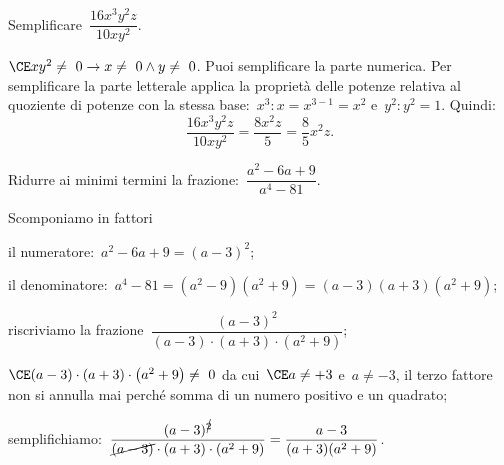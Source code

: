 \begin{exrig}
 \begin{esempio}
Semplificare~$\dfrac{16x^{3}y^{2}z}{10xy^{2}}$.

$\CE xy^{2}\neq~0 \rightarrow x\neq~0 \wedge y\neq~0$.
Puoi semplificare la parte numerica.
Per semplificare la parte letterale applica la proprietà delle potenze relativa al quoziente di potenze con la stessa
base:~$x^{3}:x=x^{3-1}=x^{2}$ e~$y^{2}:y^{2}=1$. Quindi:
\[\frac{16x^{3}y^{2}z}{10xy^{2}}=\frac{8x^{2}z}{5}=\frac{8}{5}x^{2}z.\]
 \end{esempio}

 \begin{esempio}
Ridurre ai minimi termini la frazione:~$\dfrac{a^{2}-6a+9}{a^{4}-81}$.
\begin{itemize*}
 \item Scomponiamo in fattori
  \begin{itemize*}
  \item il numeratore:~$a^2 - 6a +9 = (a - 3 )^2$;
  \item il denominatore:~$a^4 - 81 = \left(a^2 - 9\right)\left(a^2 + 9\right) = (a - 3)(a + 3)\left(a^2 + 9\right)$;
  \end{itemize*}
 \item riscriviamo la frazione~$\dfrac{\left(a-3\right)^{2}}{(a-3)\cdot(a+3)\cdot \left(a^{2}+9\right)}$;
 \item $\CE (a-3)\cdot(a+3)\cdot\left(a^{2}+9\right)\neq~0$ da cui~$\CE a \neq +3$ e~$a \neq -3$,
    il terzo fattore non si annulla mai perché somma di un numero positivo e un quadrato;
 \item semplifichiamo:~$\dfrac{(a-3)^{\cancel{2}}}{\cancel{(a-3)}\cdot (a+3)\cdot \left(a^{2}+9\right)}=\dfrac{a-3}{\left(a+3)(a^{2}+9\right)}$.
\end{itemize*}
 \end{esempio}


\end{exrig}

